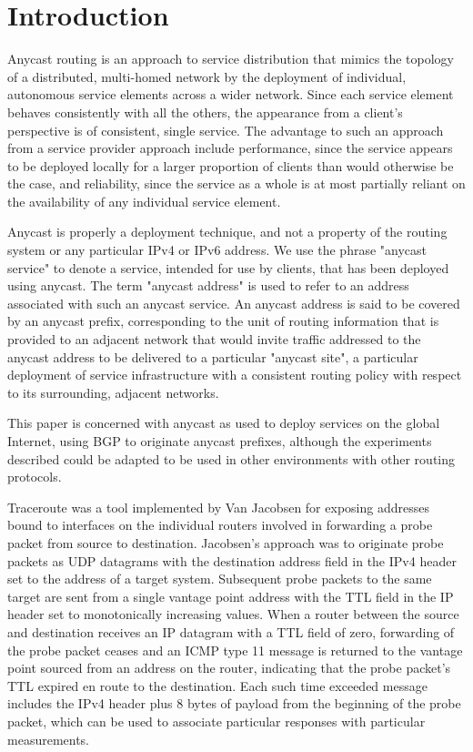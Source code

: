 \documentclass[9pt,technote,letterpaper]{IEEEtran}
\begin{document}
\section{Introduction}
Anycast\cite{RFC4786} routing is an approach to service distribution that mimics the topology of a distributed, multi-homed network by the deployment of individual, autonomous service elements across a wider network. Since each service element behaves consistently with all the others, the appearance from a client's perspective is of consistent, single service. The advantage to such an approach from a service provider approach include performance, since the service appears to be deployed locally for a larger proportion of clients than would otherwise be the case, and reliability, since the service as a whole is at most partially reliant on the availability of any individual service element.

Anycast is properly a deployment technique, and not a property of the routing system or any particular IPv4 or IPv6 address. We use the phrase "anycast service" to denote a service, intended for use by clients, that has been deployed using anycast. The term "anycast address" is used to refer to an address associated with such an anycast service.  An anycast address is said to be covered by an anycast prefix, corresponding to the unit of routing information that is provided to an adjacent network that would invite traffic addressed to the anycast address to be delivered to a particular "anycast site", a particular deployment of service infrastructure with a consistent routing policy with respect to its surrounding, adjacent networks.

This paper is concerned with anycast as used to deploy services on the global Internet, using BGP\cite{RFC4271} to originate anycast prefixes, although the experiments described could be adapted to be used in other environments with other routing protocols.

Traceroute was a tool implemented by Van Jacobsen for exposing addresses bound to interfaces on the individual routers involved in forwarding a probe packet from source to destination. Jacobsen's approach was to originate probe packets as UDP datagrams \cite{RFC0768} with the destination address field in the IPv4 \cite{RFC0791} header set to the address of a target system. Subsequent probe packets to the same target are sent from a single vantage point address with the TTL field in the IP header set to monotonically increasing values. When a router between the source and destination receives an IP datagram with a TTL field of zero, forwarding of the probe packet ceases and an ICMP type 11 message \cite{RFC0792} is returned to the vantage point sourced from an address on the router, indicating that the probe packet's TTL expired en route to the destination. Each such time exceeded message includes the IPv4 header plus 8 bytes of payload from the beginning of the probe packet, which can be used to associate particular responses with particular measurements.
\end{document}
